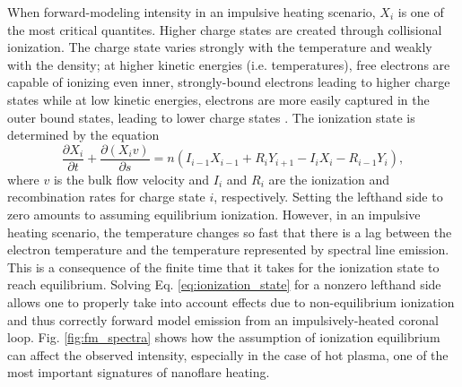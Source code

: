 %
\par When forward-modeling intensity in an impulsive heating scenario, $X_i$ is one of the most critical quantites. Higher charge states are created through collisional ionization. The charge state varies strongly with the temperature and weakly with the density; at higher kinetic energies (i.e. temperatures), free electrons are capable of ionizing even inner, strongly-bound electrons leading to higher charge states while at low kinetic energies, electrons are more easily captured in the outer bound states, leading to lower charge states \citep{bradshaw_collisional_2013}. The ionization state is determined by the equation
\begin{equation}
	\frac{\partial X_i}{\partial t} + \frac{\partial(X_iv)}{\partial s} = n(I_{i-1}X_{i-1} + R_iY_{i+1} - I_iX_i - R_{i-1}Y_i),
	\label{eq:ionization_state}
\end{equation}
where $v$ is the bulk flow velocity and $I_i$ and $R_i$ are the ionization and recombination rates for charge state $i$, respectively. Setting the lefthand side to zero amounts to assuming equilibrium ionization. However, in an impulsive heating scenario, the temperature changes so fast that there is a lag between the electron temperature and the temperature represented by spectral line emission. This is a consequence of the finite time that it takes for the ionization state to reach equilibrium. Solving Eq. \ref{eq:ionization_state} for a nonzero lefthand side allows one to properly take into account effects due to non-equilibrium ionization and thus correctly forward model emission from an impulsively-heated coronal loop. Fig. \ref{fig:fm_spectra} shows how the assumption of ionization equilibrium can affect the observed intensity, especially in the case of hot plasma, one of the most important signatures of nanoflare heating.
%

